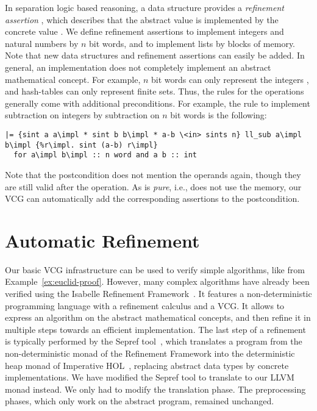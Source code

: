 \documentclass[a4paper,oribibl,envcountsame]{llncs}
\begin{document}
In separation logic based reasoning, a data structure provides a \emph{refinement assertion} , which describes 
that the abstract value  is implemented by the concrete value . 
We define refinement assertions to implement integers and natural numbers by $n$ bit words, and to implement lists by blocks of memory. 
Note that new data structures and refinement assertions can easily be added. In general, an implementation does not completely implement an abstract mathematical concept.
For example, $n$ bit words can only represent the integers , and hash-tables can only represent finite sets. Thus, the rules for the operations generally come with additional preconditions. 
For example, the rule to implement subtraction on integers by subtraction on $n$ bit words is the following:
\begin{lstlisting}
|= {sint a a\impl * sint b b\impl * a-b \<in> sints n} ll_sub a\impl b\impl {%r\impl. sint (a-b) r\impl}
  for a\impl b\impl :: n word and a b :: int
\end{lstlisting}
Note that the postcondition does not mention the operands  again, though they are still valid after the operation. 
As  is \emph{pure}, i.e., does not use the memory, our VCG can automatically add the corresponding assertions to the postcondition. 


\section{Automatic Refinement}\label{sec:auto_ref}
Our basic VCG infrastructure can be used to verify simple algorithms, like  from Example~\ref{ex:euclid-proof}.
However, many complex algorithms have already been verified using the Isabelle Refinement Framework~\cite{LaTu12}.
It features a non-deterministic programming language with a refinement calculus and a VCG. 
It allows to express an algorithm on the abstract mathematical concepts, and then refine it in multiple steps towards an efficient implementation.
The last step of a refinement is typically performed by the Sepref tool~\cite{La15}, which translates a program from the non-deterministic monad of the Refinement Framework 
into the deterministic heap monad of Imperative HOL~\cite{BKHEM08}, replacing abstract data types by concrete implementations. 
%
We have modified the Sepref tool to translate to our LLVM monad instead.
We only had to modify the translation phase. The preprocessing phases, which only work on the abstract program, remained unchanged.
\end{document}
